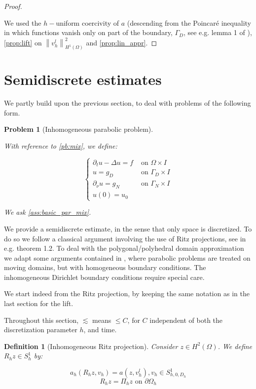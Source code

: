 \documentclass[english,a4paper,9pt,oneside]{scrbook}	%
\theoremstyle{break}
\newtheorem{defn}[equation]{Definition}
\newtheorem{pb}[equation]{Problem}
\newenvironment{mproof}[1][\proofname]{%
  \begin{proof}[#1]$ $\par\nobreak\ignorespaces
}{%
  \end{proof}
}
\renewcommand*{\proofname}{Proof}
\theoremstyle{remark}
\newcommand{\norm}[1]{\left\lVert#1\right\rVert}
\begin{document}
\begin{appendices}
\begin{mproof}
We used the $h-$uniform coercivity of $a$ (descending from the Poincaré inequality in which functions vanish only on part of the boundary, $\Gamma_D$, see e.g. lemma 1 of \cite{dorfler}), \cref{prop:lift} on $\norm{v_h^l}_{H^1(\Omega)}^2$ and \cref{prop:lin_appr}.
\end{mproof}

\section{Semidiscrete estimates}
\label{sec:semid}
We partly build upon the previous section, to deal with problems of the following form.

\begin{pb}[Inhomogeneous parabolic problem]
\label{pb:inh_parabolic}

With reference to \cref{pb:mix}, we define:

$$
\left\{\begin{matrix}
\partial_t u-\Delta u = f & \text{ on } \Omega \times I \\ 
u = g_D & \text{ on } \Gamma_D \times I\\ 
\partial_\nu u = g_N & \text{ on } \Gamma_N \times I \\
u(0) =  u_0
\end{matrix}\right.
$$

We ask \cref{ass:basic_par_mix}.

\end{pb}

We provide a semidiscrete estimate, in the sense that only space is discretized. To do so we follow a classical argument involving the use of Ritz projections, see \cite{thomee} in e.g. theorem 1.2. To deal with the polygonal/polyhedral domain approximation we adapt some arguments contained in \cite{ranner}, where parabolic problems are treated on moving domains, but with homogeneous boundary conditions. The inhomogeneous Dirichlet boundary conditions require special care.

We start indeed from the Ritz projection, by keeping the same notation as in the last section for the lift.

Throughout this section, $\lesssim$ means $\leq C $, for $C$ independent of both the discretization parameter $h$, and time.

\begin{defn}[Inhomogeneous Ritz projection]
Consider $z \in H^2(\Omega)$. We define $R_h z \in S^1_h$ by:

$$a_h(R_h z , v_h) = a(z, v_h^l), v_h \in S^1_{h,0,D_h}$$
$$R_h z = \Pi_h z \text{ on } \partial \Omega_h$$


\end{defn}
\end{appendices}
\end{document}
